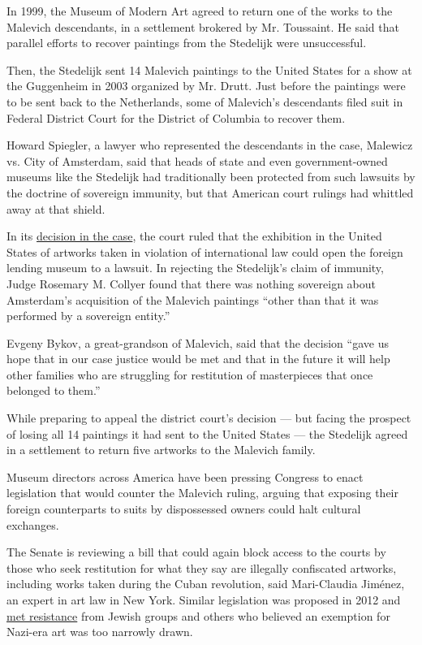 In 1999, the Museum of Modern Art agreed to return one of the works to
the Malevich descendants, in a settlement brokered by Mr. Toussaint. He
said that parallel efforts to recover paintings from the Stedelijk were
unsuccessful.

Then, the Stedelijk sent 14 Malevich paintings to the United States for
a show at the Guggenheim in 2003 organized by Mr. Drutt. Just before the
paintings were to be sent back to the Netherlands, some of Malevich's
descendants filed suit in Federal District Court for the District of
Columbia to recover them.

Howard Spiegler, a lawyer who represented the descendants in the case,
Malewicz vs. City of Amsterdam, said that heads of state and even
government-owned museums like the Stedelijk had traditionally been
protected from such lawsuits by the doctrine of sovereign immunity, but
that American court rulings had whittled away at that shield.

In its
\href{https://scholar.google.com/scholar_case?case=18213435335536066321\&q=malewicz+v.+city+of+amsterdam+2007\&hl=en\&as_sdt=6,33}{decision
in the case}, the court ruled that the exhibition in the United States
of artworks taken in violation of international law could open the
foreign lending museum to a lawsuit. In rejecting the Stedelijk's claim
of immunity, Judge Rosemary M. Collyer found that there was nothing
sovereign about Amsterdam's acquisition of the Malevich paintings
``other than that it was performed by a sovereign entity.''

Evgeny Bykov, a great-grandson of Malevich, said that the decision
``gave us hope that in our case justice would be met and that in the
future it will help other families who are struggling for restitution of
masterpieces that once belonged to them.''

While preparing to appeal the district court's decision --- but facing
the prospect of losing all 14 paintings it had sent to the United States
--- the Stedelijk agreed in a settlement to return five artworks to the
Malevich family.

Museum directors across America have been pressing Congress to enact
legislation that would counter the Malevich ruling, arguing that
exposing their foreign counterparts to suits by dispossessed owners
could halt cultural exchanges.

The Senate is reviewing a bill that could again block access to the
courts by those who seek restitution for what they say are illegally
confiscated artworks, including works taken during the Cuban revolution,
said Mari-Claudia Jiménez, an expert in art law in New York. Similar
legislation was proposed in 2012 and
\href{http://www.nytimes3xbfgragh.onion/2012/05/22/arts/design/dispute-over-bill-to-protect-art-lent-to-museums.html}{met
resistance} from Jewish groups and others who believed an exemption for
Nazi-era art was too narrowly drawn.

